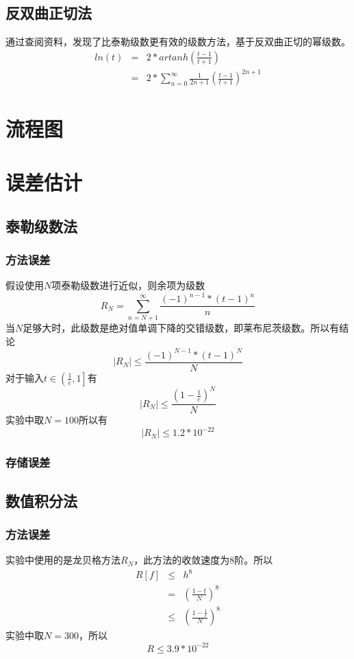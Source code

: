 \documentclass[UTF8,twocolum,titlepage]{ctexart}
\begin{document}
\subsection*{反双曲正切法}
通过查阅资料，发现了比泰勒级数更有效\cite{Logarithm_Wikipedia}的级数方法，基于反双曲正切的幂级数。
\begin{eqnarray*}
ln\left(t\right) &=&2*artanh\left(\frac{t-1}{t+1}\right)\\&=&2*\sum_{n=0}^{\infty}\frac{1}{2n+1}\left(\frac{t-1}{t+1}\right)^{2n+1}
\end{eqnarray*}

\section*{流程图}

\section*{误差估计}
\subsection*{泰勒级数法}
\subsubsection*{方法误差}
假设使用$N$项泰勒级数进行近似，则余项为级数$$R_N=\sum\limits_{n=N+1}^{\infty}\frac{\left(-1\right)^{n-1}*\left(t-1\right)^{n}}{n}$$
当$N$足够大时，此级数是绝对值单调下降的交错级数，即莱布尼茨级数。所以有结论$$\left|R_N\right| \le  \frac{\left(-1\right)^{N-1}*\left(t-1\right)^{N}}{N}$$对于输入$t\in\left(\frac{1}{e},1 \right]$有$$\left|R_N\right| \le \frac{\left(1-\frac{1}{e}\right)^N}{N}$$实验中取$N=100$所以有$$\left|R_N\right| \le 1.2*10^{-22}$$
\subsubsection*{存储误差}

\subsection*{数值积分法}
\subsubsection*{方法误差}
实验中使用的是龙贝格方法$R_N$，此方法的收敛速度为8阶。所以
\begin{eqnarray*}
R\left[f\right] &\le& h^8\\&=&\left(\frac{1-t}{N}\right)^8\\ &\le& \left(\frac{1-\frac{1}{e}}{N}\right)^8
\end{eqnarray*}
实验中取$N=300$，所以$$R \le 3.9*10^{-22}$$
\end{document}
